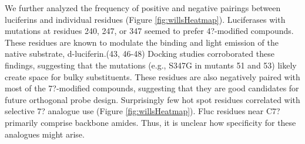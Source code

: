 We further analyzed the frequency of positive and negative pairings between luciferins and individual residues (Figure \ref{fig:willsHeatmap}). Luciferases with mutations at residues 240, 247, or 347 seemed to prefer 4?-modified compounds. These residues are known to modulate the binding and light emission of the native substrate, d-luciferin.\cite{Harwood:2011gl,Branchini:2003kt,Branchini:2007bw,Viviani:2013cj}(43, 46-48) Docking studies corroborated these findings, suggesting that the mutations (e.g., S347G in mutants 51 and 53) likely create space for bulky substituents.
These residues are also negatively paired with most of the 7?-modified compounds, suggesting that they are good candidates for future orthogonal probe design. Surprisingly few hot spot residues correlated with selective 7? analogue use (Figure \ref{fig:willsHeatmap}). Fluc residues near C7? primarily comprise backbone amides.\cite{Sundlov:2012kn,Viviani:2013ej} Thus, it is unclear how specificity for these analogues might arise.


